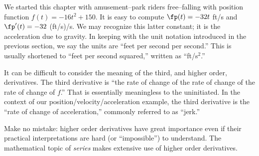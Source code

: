 We started this chapter with amusement--park riders free--falling with position function $f(t) = -16t^2+150$. It is easy to compute $\fp(t)=-32t$ ft/s and $\fp'(t) = -32$ (ft/s)/s. We may recognize this latter constant; it is the acceleration due to gravity. In keeping with the unit notation introduced in the previous section, we say the units are ``feet per second per second.'' This is usually shortened to ``feet per second squared,'' written as ``ft/s$^2$.''

It can be difficult to consider the meaning of the third, and higher order, derivatives. The third derivative is ``the rate of change of the rate of change of the rate of change of $f$.'' That is essentially meaningless to the uninitiated. In the context of our position/velocity/acceleration example, the third derivative is the ``rate of change of acceleration,'' commonly referred to as ``jerk.'' 

Make no mistake: higher order derivatives have great importance even if their practical interpretations are hard (or ``impossible'') to understand. The mathematical topic of \textit{series} makes extensive use of higher order derivatives.

